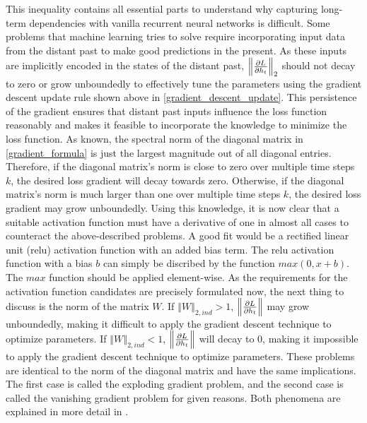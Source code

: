 \documentclass[draft,final]{vutinfth} %
\begin{document}
    This inequality contains all essential parts to understand why capturing long-term dependencies with vanilla recurrent neural networks is difficult.
    Some problems that machine learning tries to solve require incorporating input data from the distant past to make good predictions in the present.
    As these inputs are implicitly encoded in the states of the distant past, $\left\Vert \pdv{L}{h_t} \right\Vert_2$ should not decay to zero or grow unboundedly to effectively tune the parameters using the gradient descent update rule shown above in \ref{gradient_descent_update}.
    This persistence of the gradient ensures that distant past inputs influence the loss function reasonably and makes it feasible to incorporate the knowledge to minimize the loss function.
    As known, the spectral norm of the diagonal matrix in \ref{gradient_formula} is just the largest magnitude out of all diagonal entries.
    Therefore, if the diagonal matrix's norm is close to zero over multiple time steps $k$, the desired loss gradient will decay towards zero.
    Otherwise, if the diagonal matrix's norm is much larger than one over multiple time steps $k$, the desired loss gradient may grow unboundedly.
    Using this knowledge, it is now clear that a suitable activation function must have a derivative of one in almost all cases to counteract the above-described problems.
    A good fit would be a rectified linear unit (relu) activation function with an added bias term.
    The relu activation function with a bias $b$ can simply be discribed by the function $max(0,x+b)$. The $max$ function should be applied element-wise.
    As the requirements for the activation function candidates are precisely formulated now, the next thing to discuss is the norm of the matrix $W$.
    If $\left\Vert W \right\Vert_{2,ind} > 1$, $\left\Vert \pdv{L}{h_t} \right\Vert$ may grow unboundedly, making it difficult to apply the gradient descent technique to optimize parameters.
    If $\left\Vert W \right\Vert_{2,ind} < 1$, $\left\Vert \pdv{L}{h_t} \right\Vert$ will decay to $0$, making it impossible to apply the gradient descent technique to optimize parameters.
    These problems are identical to the norm of the diagonal matrix and have the same implications.
    The first case is called the exploding gradient problem, and the second case is called the vanishing gradient problem for given reasons.
    Both phenomena are explained in more detail in \cite{LongTermDependenciesGradientDescent}.
\end{document}

